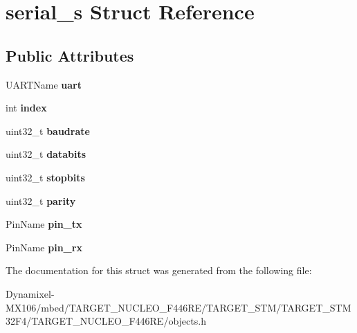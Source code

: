 \hypertarget{structserial__s}{}\section{serial\+\_\+s Struct Reference}
\label{structserial__s}
\subsection*{Public Attributes}
\begin{DoxyCompactItemize}
\item 
U\+A\+R\+T\+Name {\bfseries uart}\hypertarget{structserial__s_a77a9c76d99c0639fb9fccc71642da5ff}{}\label{structserial__s_a77a9c76d99c0639fb9fccc71642da5ff}

\item 
int {\bfseries index}\hypertarget{structserial__s_a6d2c4aa9f7793e754e983aead3238405}{}\label{structserial__s_a6d2c4aa9f7793e754e983aead3238405}

\item 
uint32\+\_\+t {\bfseries baudrate}\hypertarget{structserial__s_af00f99d918c0ff68babc714019ac5bd5}{}\label{structserial__s_af00f99d918c0ff68babc714019ac5bd5}

\item 
uint32\+\_\+t {\bfseries databits}\hypertarget{structserial__s_a7556cf309eaac0cf8051974a07ae7141}{}\label{structserial__s_a7556cf309eaac0cf8051974a07ae7141}

\item 
uint32\+\_\+t {\bfseries stopbits}\hypertarget{structserial__s_a10710adc86d1199fa99f7db0c3ac9142}{}\label{structserial__s_a10710adc86d1199fa99f7db0c3ac9142}

\item 
uint32\+\_\+t {\bfseries parity}\hypertarget{structserial__s_a23a21b947c24e2042edf773382519d34}{}\label{structserial__s_a23a21b947c24e2042edf773382519d34}

\item 
Pin\+Name {\bfseries pin\+\_\+tx}\hypertarget{structserial__s_aee4c97ca5053859f9773939d898242cc}{}\label{structserial__s_aee4c97ca5053859f9773939d898242cc}

\item 
Pin\+Name {\bfseries pin\+\_\+rx}\hypertarget{structserial__s_adf865212990c9220dc1ef3a5eb9b0870}{}\label{structserial__s_adf865212990c9220dc1ef3a5eb9b0870}

\end{DoxyCompactItemize}


The documentation for this struct was generated from the following file\+:\begin{DoxyCompactItemize}
\item 
Dynamixel-\/\+M\+X106/mbed/\+T\+A\+R\+G\+E\+T\+\_\+\+N\+U\+C\+L\+E\+O\+\_\+\+F446\+R\+E/\+T\+A\+R\+G\+E\+T\+\_\+\+S\+T\+M/\+T\+A\+R\+G\+E\+T\+\_\+\+S\+T\+M32\+F4/\+T\+A\+R\+G\+E\+T\+\_\+\+N\+U\+C\+L\+E\+O\+\_\+\+F446\+R\+E/objects.\+h\end{DoxyCompactItemize}
